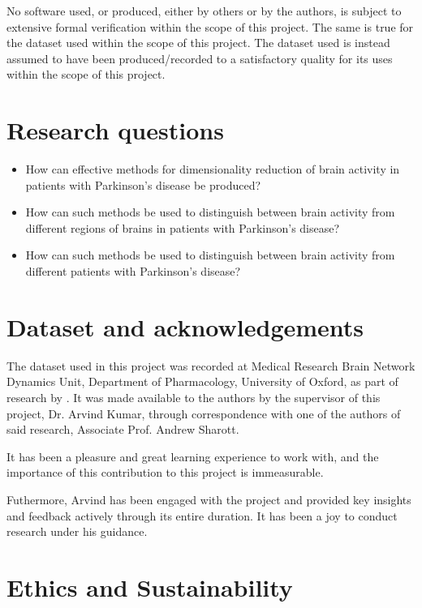 \documentclass{kththesis}
\begin{document}
No software used, or produced, either by others or by the authors, is subject to extensive formal verification within the scope of this project. 
The same is true for the dataset used within the scope of this project.
The dataset used is instead assumed to have been produced/recorded to a satisfactory quality for its uses within the scope of this project.

\section{Research questions}

\begin{itemize}
    \item How can effective methods for dimensionality reduction of brain activity in patients with Parkinson's disease be produced?
    \item How can such methods be used to distinguish between brain activity from different regions of brains in patients with Parkinson's disease?
    \item How can such methods be used to distinguish between brain activity from different patients with Parkinson's disease?
\end{itemize}

\section{Dataset and acknowledgements}

The dataset used in this project was recorded at Medical Research Brain Network Dynamics Unit, Department of Pharmacology, University of Oxford, as part of research by \textcite{Cagnan}.
It was made available to the authors by the supervisor of this project, Dr. Arvind Kumar, through correspondence with one of the authors of said research, Associate Prof. Andrew Sharott.

It has been a pleasure and great learning experience to work with, and the importance of this contribution to this project is immeasurable.

Futhermore, Arvind has been engaged with the project and provided key insights and feedback actively through its entire duration.
It has been a joy to conduct research under his guidance.

\section{Ethics and Sustainability}
\end{document}
